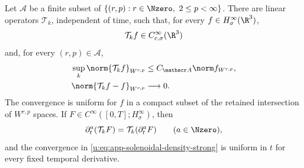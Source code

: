 \begin{lemma}
\label{u:lem:app-solenoidal-density}
Let \(\mathscr A\) be a finite subset of
\(\{(r,p):r\in\Nzero,\ 2\le p<\infty\}\).  There are linear operators
\(\mathcal T_k\), independent of time, such that, for every
\(f\in H^\infty_\sigma(\R^3)\),
\[
 \mathcal T_kf\in C_{c,\sigma}^\infty(\R^3)
\]
and, for every \((r,p)\in\mathscr A\),
\begin{align}
 \sup_k\norm{\mathcal T_kf}_{W^{r,p}}
 &\le C_{\mathscr A}\norm f_{W^{r,p}},
 \label{u:eq:app-solenoidal-density-uniform}\\
 \norm{\mathcal T_kf-f}_{W^{r,p}}&\longrightarrow0.
 \label{u:eq:app-solenoidal-density-strong}
\end{align}
The convergence is uniform for \(f\) in a compact subset of the retained
intersection of \(W^{r,p}\) spaces.  If
\(F\in C^\infty([0,T];H^\infty_\sigma)\), then
\begin{equation}
 \partial_t^a(\mathcal T_kF)=\mathcal T_k(\partial_t^aF)
 \qquad(a\in\Nzero),
 \label{u:eq:app-solenoidal-density-time}
\end{equation}
and the convergence in
\eqref{u:eq:app-solenoidal-density-strong} is uniform in \(t\) for every
fixed temporal derivative.
\end{lemma}

